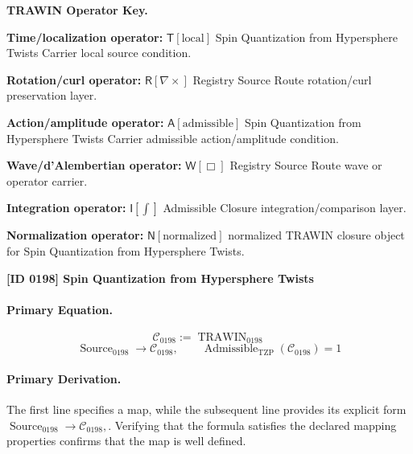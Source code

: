 \par\vspace{0.45\baselineskip}
\noindent\begin{minipage}[t]{\linewidth}
\begingroup
\small
\raggedright
\textbf{TRAWIN Operator Key.}\par
\noindent\textbf{Time/localization operator:} $\mathsf{T}\!\left[\mathrm{local}\right]$ Spin Quantization from Hypersphere Twists Carrier local source condition.\par
\noindent\textbf{Rotation/curl operator:} $\mathsf{R}\!\left[\nabla\times\right]$ Registry Source Route rotation/curl preservation layer.\par
\noindent\textbf{Action/amplitude operator:} $\mathsf{A}\!\left[\mathrm{admissible}\right]$ Spin Quantization from Hypersphere Twists Carrier admissible action/amplitude condition.\par
\noindent\textbf{Wave/d'Alembertian operator:} $\mathsf{W}\!\left[\Box\right]$ Registry Source Route wave or operator carrier.\par
\noindent\textbf{Integration operator:} $\mathsf{I}\!\left[\int\right]$ Admissible Closure integration/comparison layer.\par
\noindent\textbf{Normalization operator:} $\mathsf{N}\!\left[\mathrm{normalized}\right]$ normalized TRAWIN closure object for Spin Quantization from Hypersphere Twists.\par
\endgroup
\end{minipage}

\clearpage
\noindent\textbf{[ID 0198] Spin Quantization from Hypersphere Twists}\par
\vspace{0.35em}
\paragraph{Primary Equation.}
\[
\mathcal{C}_{0198} := \operatorname{TRAWIN}_{0198}
\]
\[
\operatorname{Source}_{0198}\longrightarrow \mathcal{C}_{0198},
\qquad
\operatorname{Admissible}_{\mathrm{TZP}}\!\left(\mathcal{C}_{0198}\right)=1
\]

\paragraph{Primary Derivation.}
The first line specifies a map, while the subsequent line provides its explicit form \( \operatorname{Source}_{0198}\longrightarrow \mathcal{C}_{0198}, \). Verifying that the formula satisfies the declared mapping properties confirms that the map is well defined.
